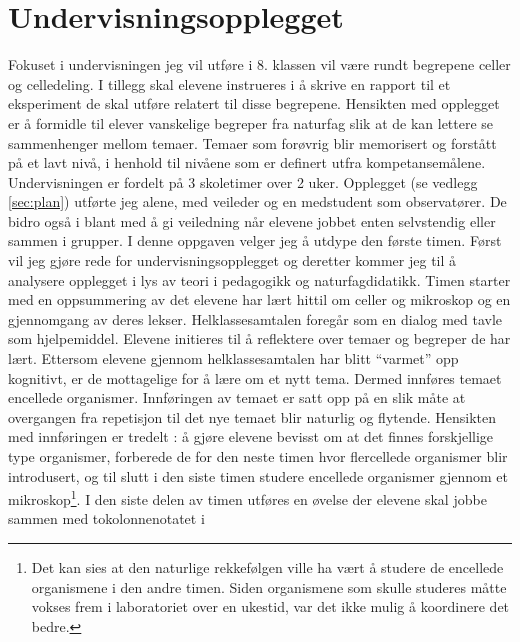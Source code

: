 \documentclass[main.tex]{subfiles}
\begin{document}
\section*{Undervisningsopplegget}
\label{sec:1}
Fokuset i undervisningen jeg vil utføre i 8. klassen vil være rundt begrepene celler og celledeling. 
I tillegg skal elevene instrueres i å skrive en rapport til et eksperiment de skal utføre relatert 
til disse begrepene. Hensikten med opplegget er å formidle til elever vanskelige begreper fra 
naturfag slik at de kan lettere se sammenhenger mellom temaer. Temaer som forøvrig blir memorisert 
og forstått på et lavt nivå, i henhold til nivåene som er definert utfra kompetansemålene. 
\newline
\newline
Undervisningen er fordelt på 3 skoletimer over 2 uker. Opplegget (se vedlegg \ref{sec:plan}) 
utførte jeg alene, med veileder og en medstudent som observatører. De bidro også i blant 
med å gi veiledning når elevene jobbet enten selvstendig eller sammen i grupper. I denne 
oppgaven velger jeg å utdype den første timen. Først vil jeg gjøre rede for undervisningsopplegget 
og deretter kommer jeg til å analysere opplegget i lys av teori i pedagogikk og naturfagdidatikk.
\newline
\newline
Timen starter med en oppsummering av det elevene har lært hittil om celler og mikroskop og en 
gjennomgang av deres lekser. Helklassesamtalen foregår som en dialog med tavle som hjelpemiddel. 
Elevene initieres til å reflektere over temaer og begreper de har lært. Ettersom elevene gjennom 
helklassesamtalen har blitt ``varmet'' opp kognitivt, er de mottagelige for å lære om et nytt tema. 
Dermed innføres temaet encellede organismer. Innføringen av temaet er satt opp på en slik 
måte at overgangen fra repetisjon til det nye temaet blir naturlig og flytende. Hensikten med 
innføringen er tredelt : å gjøre elevene bevisst om at det finnes forskjellige 
type organismer, forberede de for den neste timen hvor flercellede organismer blir introdusert, og 
til slutt i den siste timen studere encellede organismer gjennom et mikroskop\footnote{Det kan sies 
at den naturlige rekkefølgen ville ha vært å studere de encellede organismene i den andre timen. 
Siden organismene som skulle studeres måtte vokses frem i laboratoriet over en ukestid, var det ikke 
mulig å koordinere det bedre.}.
\newline
\newline
I den siste delen av timen utføres en øvelse der elevene skal jobbe sammen med tokolonnenotatet i 
\end{document}
